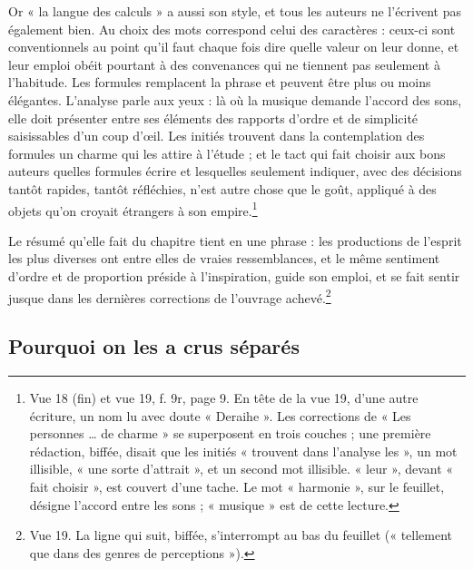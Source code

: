 \documentclass[11pt,a4paper]{article}
\begin{document}
Or « la langue des calculs » a aussi son style, et tous les auteurs ne
l'écrivent pas également bien. Au choix des mots correspond celui des
caractères : ceux-ci sont conventionnels au point qu'il faut chaque fois dire
quelle valeur on leur donne, et leur emploi obéit pourtant à des convenances
qui ne tiennent pas seulement à l'habitude. Les formules remplacent la phrase
et peuvent être plus ou moins élégantes. L'analyse parle aux yeux : là où la
musique demande l'accord des sons, elle doit présenter entre ses éléments des
rapports d'ordre et de simplicité saisissables d'un coup d'œil. Les initiés
trouvent dans la contemplation des formules un charme qui les attire à l'étude ;
et le tact qui fait choisir aux bons auteurs quelles formules écrire et
lesquelles seulement indiquer, avec des décisions tantôt rapides, tantôt
réfléchies, n'est autre chose que le goût, appliqué à des objets qu'on croyait
étrangers à son empire.\footnote{Vue 18 (fin) et vue 19, f. 9r, page 9. En tête
de la vue 19, d'une autre écriture, un nom lu avec doute « Deraihe ». Les
corrections de « Les personnes \ldots{} de charme » se superposent en trois
couches ; une première rédaction, biffée, disait que les initiés « trouvent
dans l'analyse les », un mot illisible, « une sorte d'attrait », et un second mot illisible.
« leur », devant « fait choisir », est couvert d'une tache. Le mot
« harmonie », sur le feuillet, désigne l'accord entre les sons ; « musique » est
de cette lecture.}

Le résumé qu'elle fait du chapitre tient en une phrase : les productions de
l'esprit les plus diverses ont entre elles de vraies ressemblances, et le même
sentiment d'ordre et de proportion préside à l'inspiration, guide son emploi,
et se fait sentir jusque dans les dernières corrections de l'ouvrage
achevé.\footnote{Vue 19. La ligne qui suit, biffée, s'interrompt au bas du
feuillet (« tellement que dans des genres de perceptions »).}

\subsection*{Pourquoi on les a crus séparés}
\end{document}
